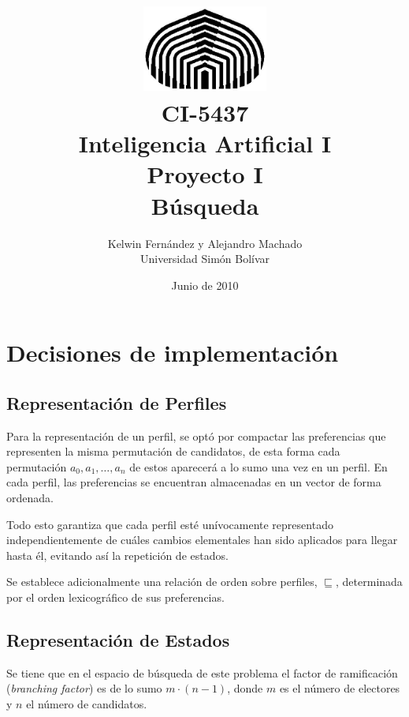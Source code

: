 \documentclass[letterpaper,12pt, titlepage]{article}
\begin{document}
\title{	\includegraphics[height=80pt]{usb.jpg} \\
CI-5437 \\ Inteligencia Artificial I \\
Proyecto I\\
Búsqueda}
\author{Kelwin Fernández y Alejandro Machado\\
	Universidad Simón Bolívar} 
\date{Junio de 2010} 
\maketitle

\section{Decisiones de implementación}

\subsection{Representación de Perfiles}

Para la representación de un perfil, se optó por
compactar las preferencias que representen
la misma permutación de candidatos, de esta forma cada permutación
$a_0, a_1, \ldots, a_n$ de estos aparecerá a lo sumo una vez
en un perfil. En cada perfil, las preferencias se encuentran
almacenadas en un vector de forma ordenada.

Todo esto garantiza que cada perfil esté unívocamente representado
independientemente de cuáles cambios elementales han sido aplicados
para llegar
hasta él, evitando así la repetición de estados.

Se establece adicionalmente una relación de orden sobre perfiles,
$\sqsubseteq$, determinada por el orden lexicográfico de sus
preferencias.

\subsection{Representación de Estados}

Se tiene que en el espacio de búsqueda de este problema
el factor de ramificación (\emph{branching factor}) es de
lo sumo $m\cdot(n-1)$, donde $m$ es el número de electores y $n$
el número de candidatos.
\end{document}
